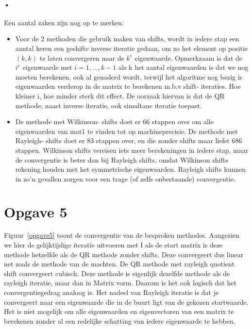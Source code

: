 \documentclass[]{article}
\newcommand{\opgave}[1]{\pagebreak\section*{Opgave #1}}
\begin{document}
\paragraph{•}
Een aantal zaken zijn nog op te merken:
\begin{itemize}
	\item Voor de 2 methoden die gebruik maken van shifts, wordt in iedere stap een aantal keren een geshifte inverse iteratie gedaan, om zo het element op positie $(k,k)$ te laten convergeren naar de $k^{e}$ eigenwaarde. Opmerkzaam is dat de $i^{e}$ eigenwaarde met $i = 1,\dots,k-1$ als k het aantal eigenwaarden is dat we nog moeten berekenen, ook al genaderd wordt, terwijl het algoritme nog bezig is eigenwaarden verderop in de matrix te berekenen m.b.v shift- iteraties. Hoe kleiner i, hoe minder sterk dit effect. De oorzaak hiervan is dat de QR methode, naast inverse iteratie, ook simultane iteratie toepast.
	\item De methode met Wilkinson- shifts doet er 66 stappen over om alle eigenwaarden van mat1 te vinden tot op machineprecisie. De methode met Rayleigh- shifts doet er 83 stappen over, en die zonder shifts maar liefst 686 stappen. Wilkinson shifts vereisen iets meer berekeningen in iedere stap, maar de convergentie is beter dan bij Rayleigh shifts, omdat Wilkinson shifts rekening houden met het symmetrische eigenwaarden. Rayleigh shifts kunnen in zo'n gevallen zorgen voor een trage (of zelfs onbestaande) convergentie.
\end{itemize}


\opgave{5}


Figuur~\ref{opgave5} toont de convergentie van de besproken methodes. Aangezien we hier de gelijktijdige iteratie uitvoeren met I als de start matrix is deze methode hetzelfde als de QR methode zonder shifts. Deze convergeert dus linear net zoals de methode van de machten. De QR methode met rayleigh quotient shift convergeert cubisch. Deze methode is eigenlijk dezelfde methode als de rayleigh iteratie, maar dan in Matrix vorm. Daarom is het ook logisch dat het convergentiegedrag analoog is.
Het nadeel van Rayleigh iteratie is dat je convergeert naar een eigenwaarde die in de buurt ligt van de gekozen startwaarde. Het is niet mogelijk om alle eigenwaarden en eigenvectoren van een matrix te berekenen zonder al een redelijke schatting van iedere eigenwaarde te hebben.
\end{document}
